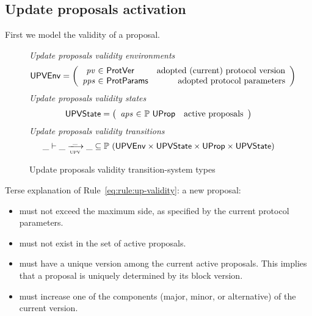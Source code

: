 \subsection{Update proposals activation}
\label{sec:update-proposals-activation}

First we model the validity of a proposal.

\begin{figure}[htb]
  \emph{Update proposals validity environments}
  \begin{equation*}
    \UPVEnv =
    \left(
      \begin{array}{r@{~\in~}lr}
        \var{pv} & \ProtVer & \text{adopted (current) protocol version}\\
        \var{pps} & \ProtParams & \text{adopted protocol parameters}\\
      \end{array}
    \right)
  \end{equation*}
  \emph{Update proposals validity states}
  \begin{equation*}
    \UPVState
    = \left(
      \begin{array}{r@{~\in~}lr}
        \var{aps} & \powerset{\UProp} & \text{active proposals}\\
      \end{array}
    \right)
  \end{equation*}
  \emph{Update proposals validity transitions}
    \begin{equation*}
    \var{\_} \vdash
    \var{\_} \trans{upv}{\_} \var{\_}
    \subseteq \powerset (\UPVEnv \times \UPVState \times \UProp \times \UPVState)
  \end{equation*}
  \caption{Update proposals validity transition-system types}
  \label{fig:ts-types:up-validity}
\end{figure}

Terse explanation of Rule~\ref{eq:rule:up-validity}: a new proposal:
\begin{itemize}
\item must not exceed the maximum side, as specified by the current
  protocol parameters.
\item must not exist in the set of active proposals.
\item must have a unique version among the current active proposals. This
  implies that a proposal is uniquely determined by its block version.
\item must increase one of the components (major, minor, or alternative) of the
  current version.
\end{itemize}

